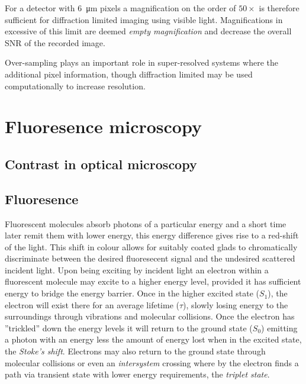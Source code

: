 For a detector with \SI{6}{\micro\meter} pixels a magnification on the order of $50\times$ is therefore sufficient for diffraction limited imaging using visible light.
Magnifications in excessive of this limit are deemed \emph{empty magnification} and decrease the overall SNR of the recorded image.

Over-sampling plays an important role in super-resolved systems where the additional pixel information, though diffraction limited may be used computationally to increase resolution.

%
%


\section{Fluoresence microscopy}
\subsection{Contrast in optical microscopy}
\subsection{Fluoresence}

Fluorescent molecules absorb photons of a particular energy and a short time later remit them with lower energy, this energy difference gives rise to a red-shift of the light.
This shift in colour allows for suitably coated glads to chromatically discriminate between the desired fluoresecent signal and the undesired scattered incident light.
Upon being exciting by incident light an electron within a fluorescent molecule may excite to a higher energy level, provided it has sufficient energy to bridge the energy barrier.
Once in the higher excited state ($S_1$), the electron will exist there for an average lifetime ($\tau$), slowly losing energy to the surroundings through vibrations and molecular collisions.
Once the electron has ''trickled'' down the energy levels it will return to the ground state ($S_0$) emitting a photon with an energy less the amount of energy lost when in the excited state, the \emph{Stoke's shift}.
Electrons may also return to the ground state through molecular collisions or even an \emph{intersystem} crossing where by the electron finds a path via transient state with lower energy requirements, the \emph{triplet state}.


